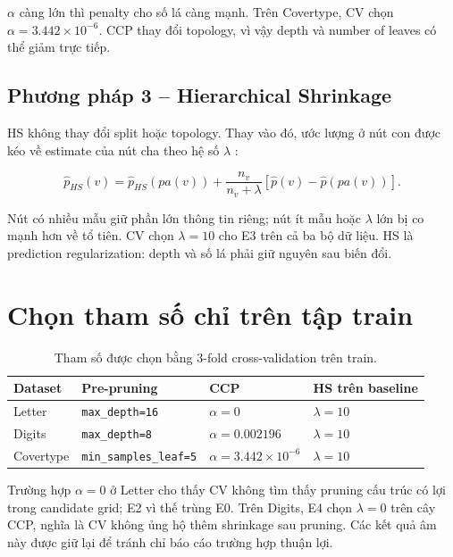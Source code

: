 $\alpha$ càng lớn thì penalty cho số lá càng mạnh. Trên Covertype, CV chọn $\alpha=3.442\times10^{-6}$. CCP thay đổi topology, vì vậy depth và number of leaves có thể giảm trực tiếp.

\subsection{Phương pháp 3 -- Hierarchical Shrinkage}

HS không thay đổi split hoặc topology. Thay vào đó, ước lượng ở nút con được kéo về estimate của nút cha theo hệ số $\lambda$ \cite{agarwal2022hs}:

\begin{equation}
    \hat p_{HS}(v)=\hat p_{HS}(pa(v))+
    \frac{n_v}{n_v+\lambda}\left[\hat p(v)-\hat p(pa(v))\right].
    \label{eq:hs}
\end{equation}

Nút có nhiều mẫu giữ phần lớn thông tin riêng; nút ít mẫu hoặc $\lambda$ lớn bị co mạnh hơn về tổ tiên. CV chọn $\lambda=10$ cho E3 trên cả ba bộ dữ liệu. HS là prediction regularization: depth và số lá phải giữ nguyên sau biến đổi.

\section{Chọn tham số chỉ trên tập train}

\begin{table}[H]
    \centering
    \small
    \caption[Tham số cải tiến được chọn bằng cross-validation]{Tham số được chọn bằng 3-fold cross-validation trên train.}
    \label{tab:improvement-parameters}
    \begin{tabularx}{\textwidth}{@{}lXXX@{}}
        \toprule
        \textbf{Dataset} & \textbf{Pre-pruning} & \textbf{CCP} & \textbf{HS trên baseline} \\
        \midrule
        Letter & \texttt{max\_depth=16} & $\alpha=0$ & $\lambda=10$ \\
        Digits & \texttt{max\_depth=8} & $\alpha=0.002196$ & $\lambda=10$ \\
        Covertype & \texttt{min\_samples\_leaf=5} & $\alpha=3.442\times10^{-6}$ & $\lambda=10$ \\
        \bottomrule
    \end{tabularx}
\end{table}

Trường hợp $\alpha=0$ ở Letter cho thấy CV không tìm thấy pruning cấu trúc có lợi trong candidate grid; E2 vì thế trùng E0. Trên Digits, E4 chọn $\lambda=0$ trên cây CCP, nghĩa là CV không ủng hộ thêm shrinkage sau pruning. Các kết quả âm này được giữ lại để tránh chỉ báo cáo trường hợp thuận lợi.

